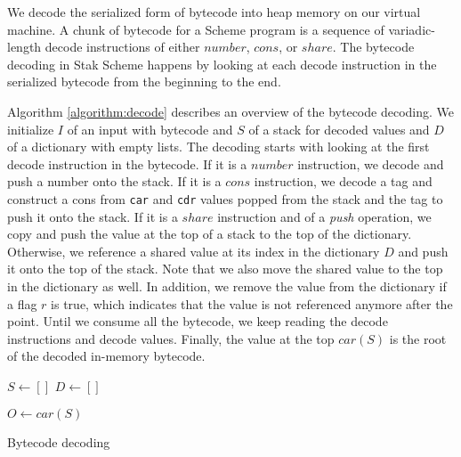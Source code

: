 \documentclass[sigplan]{acmart}
\begin{document}
We decode the serialized form of bytecode into heap memory on
our virtual machine.
A chunk of bytecode for a Scheme program is a sequence of
variadic-length decode instructions of either $number$, $cons$, or $share$.
The bytecode decoding in Stak Scheme happens by looking at each
decode instruction in
the serialized bytecode from the beginning to the end.

Algorithm \ref{algorithm:decode} describes an overview of the
bytecode decoding.
We initialize $I$ of an input with bytecode and $S$ of a stack for decoded
values and $D$ of a dictionary with empty lists.
The decoding starts with looking at the first decode instruction in
the bytecode.
If it is a $number$ instruction, we decode and push a number onto the stack.
If it is a $cons$ instruction, we decode a tag and construct a cons
from \texttt{car} and \texttt{cdr} values popped from the stack
and the tag to push it onto the stack.
If it is a $share$ instruction and of a \textit{push} operation, we
copy and push the value at the top of a stack to the top of the dictionary.
Otherwise, we reference a shared value at its index in the
dictionary $D$ and push it onto the top of the stack.
Note that we also move the shared value to the top in the dictionary as well.
In addition, we remove the value from the dictionary if a flag $r$ is
true, which indicates that the value is not referenced anymore after the point.
Until we consume all the bytecode, we keep reading the decode instructions and
decode values.
Finally, the value at the top $car(S)$ is the root of the decoded
in-memory bytecode.

\begin{algorithm}

  $S \gets []$ \;
  $D \gets []$ \;

  $O \gets car(S)$ \;

  \caption{Bytecode decoding}
  \label{algorithm:decode}
\end{algorithm}
\end{document}
